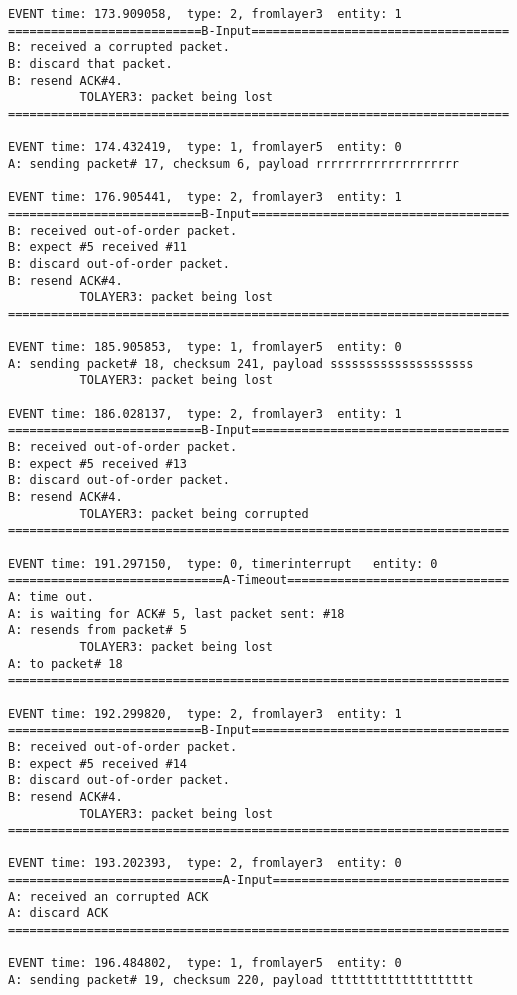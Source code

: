 \documentclass[12pt]{article}
\begin{document}
\begin{verbatim}
EVENT time: 173.909058,  type: 2, fromlayer3  entity: 1
===========================B-Input====================================
B: received a corrupted packet.
B: discard that packet.
B: resend ACK#4.
          TOLAYER3: packet being lost
======================================================================

EVENT time: 174.432419,  type: 1, fromlayer5  entity: 0
A: sending packet# 17, checksum 6, payload rrrrrrrrrrrrrrrrrrrr

EVENT time: 176.905441,  type: 2, fromlayer3  entity: 1
===========================B-Input====================================
B: received out-of-order packet.
B: expect #5 received #11
B: discard out-of-order packet.
B: resend ACK#4.
          TOLAYER3: packet being lost
======================================================================

EVENT time: 185.905853,  type: 1, fromlayer5  entity: 0
A: sending packet# 18, checksum 241, payload ssssssssssssssssssss
          TOLAYER3: packet being lost

EVENT time: 186.028137,  type: 2, fromlayer3  entity: 1
===========================B-Input====================================
B: received out-of-order packet.
B: expect #5 received #13
B: discard out-of-order packet.
B: resend ACK#4.
          TOLAYER3: packet being corrupted
======================================================================

EVENT time: 191.297150,  type: 0, timerinterrupt   entity: 0
==============================A-Timeout===============================
A: time out. 
A: is waiting for ACK# 5, last packet sent: #18
A: resends from packet# 5 
          TOLAYER3: packet being lost
A: to packet# 18
======================================================================

EVENT time: 192.299820,  type: 2, fromlayer3  entity: 1
===========================B-Input====================================
B: received out-of-order packet.
B: expect #5 received #14
B: discard out-of-order packet.
B: resend ACK#4.
          TOLAYER3: packet being lost
======================================================================

EVENT time: 193.202393,  type: 2, fromlayer3  entity: 0
==============================A-Input=================================
A: received an corrupted ACK 
A: discard ACK
======================================================================

EVENT time: 196.484802,  type: 1, fromlayer5  entity: 0
A: sending packet# 19, checksum 220, payload tttttttttttttttttttt


\end{verbatim}
\end{document}
